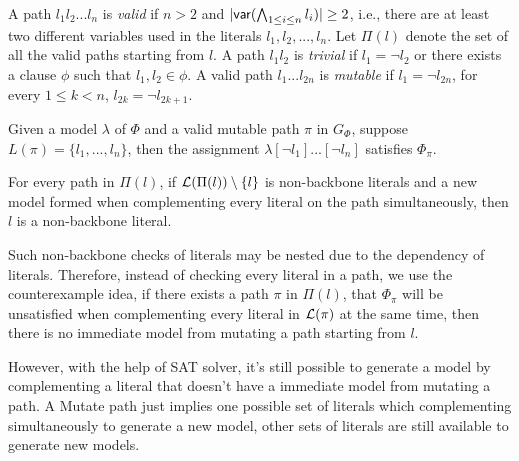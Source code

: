 A path $l_1l_2...l_n$ is \emph{valid} if $n>2$ and $|\textsf{var}(\bigwedge_{1\leq i\leq n} l_i)|\geq 2$, i.e., there are at least two different variables used in
the literals  $l_1,l_2,...,l_n$. Let $\Pi(l)$ denote the set of all the valid paths starting from $l$.
A path $l_1l_2$ is \emph{trivial} if $l_1=\neg l_2$ or there exists a clause $\phi$ such that $l_1,l_2\in\phi$.
A valid path $l_1...l_{2n}$ is \emph{mutable} if $l_1=\neg l_{2n}$, for every $1\leq k < n$, $l_{2k}=\neg l_{2k+1}$.

\begin{proposition}
Given a model $\lambda$ of $\Phi$ and a valid mutable path $\pi$ in $G_\Phi$, 
suppose $L(\pi)=\{l_1,...,l_n\}$,  then the assignment $\lambda[\neg l_1]...[\neg l_n]$ satisfies $\Phi_\pi$.
\end{proposition}
 
 
 For every path in $\Pi(l)$, if ${\cal L}(\Pi(l))\setminus\{l\}$ is non-backbone literals and a new model formed when complementing every literal on the path simultaneously, then $l$ is a non-backbone literal.

 Such non-backbone checks of literals may be nested due to the dependency of literals. Therefore, instead of checking every literal in a path, we use the counterexample idea, if there exists a path $\pi$ in $\Pi(l)$, that $\Phi_{\pi}$ will be unsatisfied when complementing every literal in ${\cal L}(\pi)$ at the same time, then there is no immediate model from mutating a path starting from $l$.

 However, with the help of SAT solver, it's still possible to generate a model by complementing a literal that doesn't have a immediate model from mutating a path. A Mutate path just implies one possible set of literals which complementing simultaneously to generate a new model, other sets of literals are still available to generate new models.

